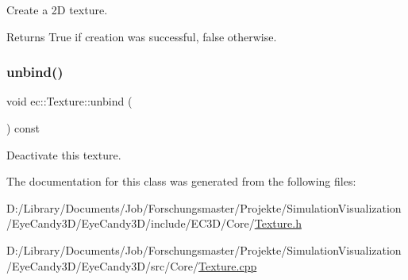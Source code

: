 Create a 2D texture. 

\begin{DoxyReturn}{Returns}
True if creation was successful, false otherwise. 
\end{DoxyReturn}
\mbox{\label{classec_1_1_texture_a95c72abc5c801df231fc970c6adffdcc}} 
\subsubsection{\texorpdfstring{unbind()}{unbind()}}
{\footnotesize\ttfamily void ec\+::\+Texture\+::unbind (\begin{DoxyParamCaption}{ }\end{DoxyParamCaption}) const}

Deactivate this texture. 

The documentation for this class was generated from the following files\+:\begin{DoxyCompactItemize}
\item 
D\+:/\+Library/\+Documents/\+Job/\+Forschungsmaster/\+Projekte/\+Simulation\+Visualization/\+Eye\+Candy3\+D/\+Eye\+Candy3\+D/include/\+E\+C3\+D/\+Core/\mbox{\hyperlink{_texture_8h}{Texture.\+h}}\item 
D\+:/\+Library/\+Documents/\+Job/\+Forschungsmaster/\+Projekte/\+Simulation\+Visualization/\+Eye\+Candy3\+D/\+Eye\+Candy3\+D/src/\+Core/\mbox{\hyperlink{_texture_8cpp}{Texture.\+cpp}}\end{DoxyCompactItemize}
